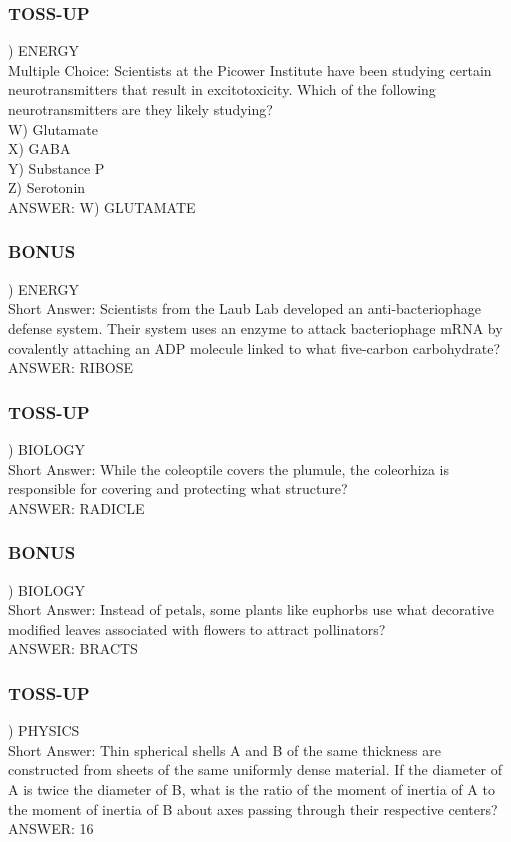 \documentclass{article}
\begin{document}
\subsubsection*{TOSS-UP}
) ENERGY \\
Multiple Choice: Scientists at the Picower Institute have been studying certain neurotransmitters that result in excitotoxicity. Which of the following neurotransmitters are they likely studying? \\
W) Glutamate \\
X) GABA \\
Y) Substance P \\
Z) Serotonin \\
ANSWER: W) GLUTAMATE

\subsubsection*{BONUS}
) ENERGY \\
Short Answer: Scientists from the Laub Lab developed an anti-bacteriophage defense system. Their system uses an enzyme to attack bacteriophage mRNA by covalently attaching an ADP molecule linked to what five-carbon carbohydrate? \\
ANSWER: RIBOSE

\newpage

\subsubsection*{TOSS-UP}
) BIOLOGY \\
Short Answer: While the coleoptile covers the plumule, the coleorhiza is responsible for covering and protecting what structure? \\
ANSWER: RADICLE

\subsubsection*{BONUS}
) BIOLOGY \\
Short Answer: Instead of petals, some plants like euphorbs use what decorative modified leaves associated with flowers to attract pollinators? \\
ANSWER: BRACTS

\subsubsection*{TOSS-UP}
) PHYSICS \\
Short Answer: Thin spherical shells A and B of the same thickness are constructed from sheets of the same uniformly dense material. If the diameter of A is twice the diameter of B, what is the ratio of the moment of inertia of A to the moment of inertia of B about axes passing through their respective centers? \\
ANSWER: 16
\end{document}
